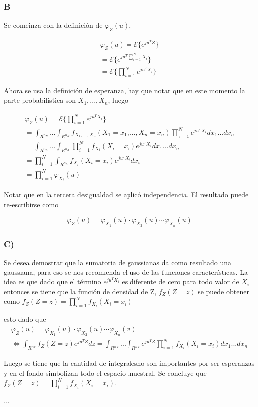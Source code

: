 	\subsubsection{B}
	Se comeinza con la definición de $\varphi_{Z}(u)$,

	\begin{eqnarray}
		\varphi_{Z}(u) = \mathcal{E} \lbrace e^{ju^TZ} \rbrace \\
		= \mathcal{E} \lbrace e^{ju^T\sum_{i=1}^NX_i} \rbrace \\
		= \mathcal{E} \lbrace \prod_{i=1}^N e^{ju^TX_i} \rbrace
	\end{eqnarray}

	Ahora se usa la definición de esperanza, hay que notar que en este momento la parte probabilística son $X_1,...,X_n$, luego

	\begin{eqnarray}
		\varphi_{Z}(u) = \mathcal{E} \lbrace \prod_{i=1}^N e^{ju^TX_i} \rbrace\\
		= \int_{R^{n_X}}...\int_{R^{n_X}} f_{X_1,...,X_n}(X_1=x_1,...,X_n=x_n)\prod_{i=1}^N e^{ju^TX_i} dx_1...dx_n \\
		= \int_{R^{n_X}}...\int_{R^{n_X}} \prod_{i=1}^N f_{X_i}(X_i=x_i)e^{ju^TX_i} dx_1...dx_n \\
		= \prod_{i=1}^N \int_{R^{n_X}} f_{X_i}(X_i=x_i)e^{ju^TX_i} dx_i \\
		= \prod_{i=1}^N \varphi_{X_i}(u)
	\end{eqnarray}

	Notar que en la tercera desigualdad se aplicó independencia. El resultado puede re-escribirse como

	\begin{equation}
		\varphi_{Z}(u) = \varphi_{X_1}(u) \cdot \varphi_{X_2}(u)  \cdots  \varphi_{X_n}(u)
	\end{equation}


	\subsubsection{C)}

	Se desea demostrar que la sumatoria de gaussianas da como resultado una gaussiana, para eso se nos recomienda el uso de las funciones características. La idea es que dado que el término $e^{ju^TX_i}$ es diferente de cero para todo valor de $X_i$ entonces se tiene que la función de densidad de Z, $f_Z(Z=z)$ se puede obtener como $f_Z(Z=z) = \prod_{i=1}^Nf_{X_i}(X_i=x_i)$

	esto dado que 
	\begin{eqnarray}
		\varphi_{Z}(u) = \varphi_{X_1}(u) \cdot \varphi_{X_2}(u)  \cdots  \varphi_{X_n}(u) \\
		\iff \int_{R^{n_Z}} f_Z(Z=z) e^{ju^TZ} dz = \int_{R^{n_X}}...\int_{R^{n_X}} e^{ju^TZ} \prod_{i=1}^N f_{X_i}(X_i=x_i) dx_1...dx_n
	\end{eqnarray}

	Luego se tiene que la cantidad de integralesno son importantes por ser esperanzas y en el fondo simbolizan todo el espacio muestral. Se concluye que $f_Z(Z=z) = \prod_{i=1}^Nf_{X_i}(X_i=x_i)$. \newline 

	...

